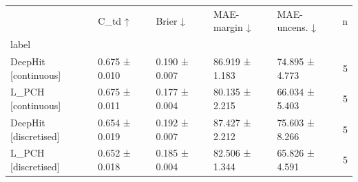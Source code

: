 \begin{tabular}{lllllr}
\toprule
 & C\_td ↑ & Brier ↓ & MAE-margin ↓ & MAE-uncens. ↓ & n \\
label &  &  &  &  &  \\
\midrule
DeepHit [continuous] & 0.675 ± 0.010 & 0.190 ± 0.007 & 86.919 ± 1.183 & 74.895 ± 4.773 & 5 \\
L\_PCH [continuous] & 0.675 ± 0.011 & 0.177 ± 0.004 & 80.135 ± 2.215 & 66.034 ± 5.403 & 5 \\
DeepHit [discretised] & 0.654 ± 0.019 & 0.192 ± 0.007 & 87.427 ± 2.212 & 75.603 ± 8.266 & 5 \\
L\_PCH [discretised] & 0.652 ± 0.018 & 0.185 ± 0.004 & 82.506 ± 1.344 & 65.826 ± 4.591 & 5 \\
\bottomrule
\end{tabular}
